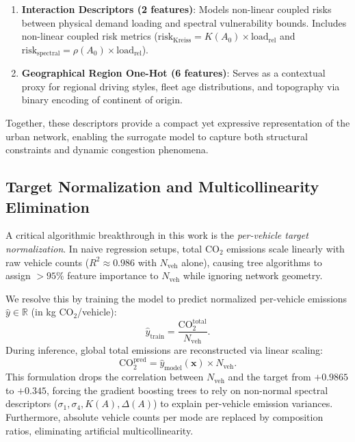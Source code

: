 \documentclass[lettersize,journal]{IEEEtran}
\begin{document}
\begin{enumerate}
    \item \textbf{Interaction Descriptors (2 features)}: Models non-linear coupled risks between physical demand loading and spectral vulnerability bounds. Includes non-linear coupled risk metrics ($\text{risk}_{\text{Kreiss}} = K(A_0) \times \text{load}_{\text{rel}}$ and $\text{risk}_{\text{spectral}} = \rho(A_0) \times \text{load}_{\text{rel}}$).
    \item \textbf{Geographical Region One-Hot (6 features)}: Serves as a contextual proxy for regional driving styles, fleet age distributions, and topography via binary encoding of continent of origin.
\end{enumerate}
Together, these descriptors provide a compact yet expressive representation of the urban network, enabling the surrogate model to capture both structural constraints and dynamic congestion phenomena.

\subsection{Target Normalization and Multicollinearity Elimination}
A critical algorithmic breakthrough in this work is the \emph{per-vehicle target normalization}. In naive regression setups, total $\text{CO}_2$ emissions scale linearly with raw vehicle counts ($R^2 \approx 0.986$ with $N_{\text{veh}}$ alone), causing tree algorithms to assign $>95\%$ feature importance to $N_{\text{veh}}$ while ignoring network geometry.

We resolve this by training the model to predict normalized per-vehicle emissions $\hat{y} \in \mathbb{R}$ (in kg $\text{CO}_2$/vehicle):
\begin{equation}
\hat{y}_{\text{train}} = \frac{\text{CO}_2^{\text{total}}}{N_{\text{veh}}}.
\end{equation}
During inference, global total emissions are reconstructed via linear scaling:
\begin{equation}
\text{CO}_2^{\text{pred}} = \hat{y}_{\text{model}}(\mathbf{x}) \times N_{\text{veh}}.
\end{equation}
This formulation drops the correlation between $N_{\text{veh}}$ and the target from $+0.9865$ to $+0.345$, forcing the gradient boosting trees to rely on non-normal spectral descriptors ($\sigma_1, \sigma_4, K(A), \Delta(A)$) to explain per-vehicle emission variances. Furthermore, absolute vehicle counts per mode are replaced by composition ratios, eliminating artificial multicollinearity.
\end{document}
